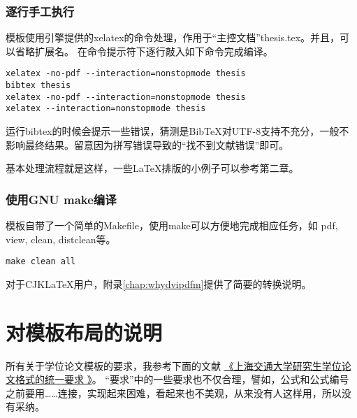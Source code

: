 \subsubsection{逐行手工执行}

模板使用{\XeTeX}引擎提供的xelatex的命令处理，作用于“主控文档”thesis.tex。并且，可以省略扩展名。
在命令提示符下逐行敲入如下命令完成编译。

\begin{lstlisting}[basicstyle=\small\ttfamily, caption={手动执行编译过程}, numbers=none]
xelatex -no-pdf --interaction=nonstopmode thesis
bibtex thesis 
xelatex -no-pdf --interaction=nonstopmode thesis
xelatex --interaction=nonstopmode thesis 
\end{lstlisting}

运行bibtex的时候会提示一些错误，猜测是{{\sc Bib}\TeX}对UTF-8支持不充分，一般不影响最终结果。留意因为拼写错误导致的“找不到文献错误”即可。

基本处理流程就是这样，一些{\LaTeX}排版的小例子可以参考第二章。

\subsubsection{使用GNU make编译}

模板自带了一个简单的Makefile，使用make可以方便地完成相应任务，如 pdf, view, clean, distclean等。

\begin{lstlisting}[basicstyle=\small\ttfamily, caption={使用GNU make编译}, numbers=none]
make clean all
\end{lstlisting}

对于CJK\LaTeX{}用户，附录\ref{chap:whydvipdfm}提供了简要的转换说明。

\section{对模板布局的说明}
\label{sec:thesisformat}

所有关于学位论文模板的要求，我参考下面的文献
\href{http://www.gs.sjtu.edu.cn/policy/fileShow.ahtml?id=130}{《上海交通大学研究生学位论文格式的统一要求 》}。
``要求''中的一些要求也不仅合理，譬如，公式和公式编号之前要用……连接，实现起来困难，看起来也不美观，从来没有人这样用，所以没有采纳。

